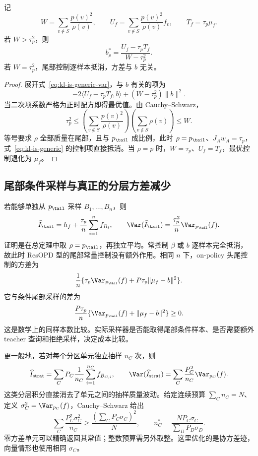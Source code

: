 \begin{proposition}[任意采样测度下的最优尾部常控制]
记
\[
 W=\sum_{v\notin S}\frac{p(v)^2}{\rho(v)},\qquad
 U_f=\sum_{v\notin S}\frac{p(v)^2}{\rho(v)}f_v,\qquad T_f=\tau_p\mu_f.
\]
若 $W>\tau_p^2$，则
\[
 b_\rho^*=\frac{U_f-\tau_pT_f}{W-\tau_p^2}.
\]
若 $W=\tau_p^2$，尾部控制逐样本抵消，方差与 $b$ 无关。
\end{proposition}
\begin{proof}
展开式~\eqref{eq:kl-is-generic-var}，与 $b$ 有关的项为
\[
 -2\langle U_f-\tau_pT_f,b\rangle+(W-\tau_p^2)\|b\|^2.
\]
当二次项系数严格为正时配方即得最优值。由 Cauchy--Schwarz，
\[
 \tau_p^2
 \le\left(\sum_{v\notin S}\frac{p(v)^2}{\rho(v)}\right)
      \left(\sum_{v\notin S}\rho(v)\right)\le W.
\]
等号要求 $\rho$ 全部质量在尾部，且与 $p_\tail$ 成比例，此时 $\rho=p_\tail$、$J_Aw_A=\tau_p$，式~\eqref{eq:kl-is-generic} 的控制项直接抵消。当 $\rho=p$ 时，$W=\tau_p$、$U_f=T_f$，最优控制退化为 $\mu_f$。
\end{proof}

\subsection{尾部条件采样与真正的分层方差减少}
若能够单独从 $p_\tail$ 采样 $B_1,\ldots,B_n$，则
\[
 \widehat I_\tail=h_f+\frac{\tau_p}{n}\sum_{i=1}^n f_{B_i},
 \qquad
 \Var(\widehat I_\tail)=\frac{\tau_p^2}{n}\Var_{p_\tail}(f).
\]
证明是在总定理中取 $\rho=p_\tail$，再独立平均。常控制 $\beta$ 或 $b$ 逐样本完全抵消，故此时 ResOPD 型的尾部常量控制没有额外作用。相同 $n$ 下，on-policy 头尾控制的方差为
\[
 \frac1n\{\tau_p\Var_{p_\tail}(f)+P\tau_p\|\mu_f-b\|^2\}.
\]
它与条件尾部采样的差为
\[
 \frac{P\tau_p}{n}\{\Var_{p_\tail}(f)+\|\mu_f-b\|^2\}\ge0.
\]
这是数学上的同样本数比较。实际采样器是否能取得尾部条件样本、是否需要额外 teacher 查询和拒绝采样，决定成本比较。

更一般地，若对每个分区单元独立抽样 $n_C$ 次，则
\[
 \widehat I_{\mathrm{strat}}
 =\sum_CP_C\frac1{n_C}\sum_{i=1}^{n_C}f_{B_{C,i}},\qquad
 \Var(\widehat I_{\mathrm{strat}})
 =\sum_C\frac{P_C^2}{n_C}\Var_{p_C}(f).
\]
这类分层积分直接消去了单元之间的抽样质量波动。给定连续预算 $\sum_Cn_C=N$、定义 $\sigma_C^2=\Var_{p_C}(f)$，Cauchy--Schwarz 给出
\[
 \sum_C\frac{P_C^2\sigma_C^2}{n_C}
 \ge\frac{(\sum_CP_C\sigma_C)^2}{N},
 \qquad n_C^*=\frac{NP_C\sigma_C}{\sum_DP_D\sigma_D}.
\]
零方差单元可以精确返回其常值；整数预算需另外取整。这里优化的是协方差迹，向量情形也使用相同 $\sigma_C$。


